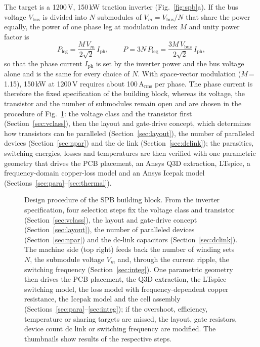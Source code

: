 \documentclass[conference]{IEEEtran}
\begin{document}
The target is a 1200\,V, 150\,kW traction inverter (Fig.~\ref{fig:spb}a). If the bus voltage $V_\mathrm{bus}$ is divided into $N$ submodules of $V_m=V_\mathrm{bus}/N$ that share the power equally, the power of one phase leg at modulation index $M$ and unity power factor is
\begin{equation}
P_\mathrm{leg}=\frac{M\,V_m}{2\sqrt2}\,I_\mathrm{ph},\qquad P=3N\,P_\mathrm{leg}=\frac{3M\,V_\mathrm{bus}}{2\sqrt2}\,I_\mathrm{ph},
\label{eq:pleg}
\end{equation}
so that the phase current $I_\mathrm{ph}$ is set by the inverter power and the bus voltage alone and is the same for every choice of $N$. With space-vector modulation ($M$\,=\,1.15), 150\,kW at 1200\,V requires about 100\,A$_\mathrm{rms}$ per phase. The phase current is therefore the fixed specification of the building block, whereas its voltage, the transistor and the number of submodules remain open and are chosen in the procedure of Fig.~\ref{fig:flow}: the voltage class and the transistor first (Section~\ref{sec:vclass}), then the layout and gate-drive concept, which determines how transistors can be paralleled (Section~\ref{sec:layout}), the number of paralleled devices (Section~\ref{sec:npar}) and the dc link (Section~\ref{sec:dclink}); the parasitics, switching energies, losses and temperatures are then verified with one parametric geometry that drives the PCB placement, an Ansys Q3D extraction, LTspice, a frequency-domain copper-loss model and an Ansys Icepak model (Sections~\ref{sec:para}--\ref{sec:thermal}).

\begin{figure}[t]
\centering
\resizebox{\textwidth}{!}{}
\caption{Design procedure of the SPB building block. From the inverter specification, four selection steps fix the voltage class and transistor (Section~\ref{sec:vclass}), the layout and gate-drive concept (Section~\ref{sec:layout}), the number of paralleled devices (Section~\ref{sec:npar}) and the dc-link capacitors (Section~\ref{sec:dclink}). The machine side (top right) feeds back the number of winding sets $N$, the submodule voltage $V_m$ and, through the current ripple, the switching frequency (Section~\ref{sec:integ}). One parametric geometry then drives the PCB placement, the Q3D extraction, the LTspice switching model, the loss model with frequency-dependent copper resistance, the Icepak model and the cell assembly (Sections~\ref{sec:para}--\ref{sec:integ}); if the overshoot, efficiency, temperature or sharing targets are missed, the layout, gate resistors, device count dc link or switching frequency are modified. The thumbnails show results of the respective steps.}
\label{fig:flow}
\end{figure}
\end{document}

